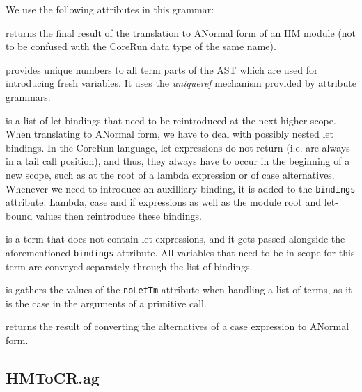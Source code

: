 \documentclass{scrartcl}
\newcommand{\attrdesc}[2]{\texttt{#1}, \emph{#2}}
\begin{document}
We use the following attributes in this grammar:

\begin{description}[style=multiline,leftmargin=4cm,font=\normalfont]

\item[\attrdesc{anf :: Mod}{synthesized}] returns the final result of the translation to ANormal form of an HM module (not to be confused with the CoreRun data type of the same name).

\item[\attrdesc{counter :: Int}{chained}] provides unique numbers to all term parts of the AST which are used for introducing fresh variables. It uses the \emph{uniqueref} mechanism provided by attribute grammars.

\item[\attrdesc{bindings :: Bindings}{synthesized}] is a list of let bindings that need to be reintroduced at the next higher scope. When translating to ANormal form, we have to deal with possibly nested let bindings. In the CoreRun language, let expressions do not return (i.e. are always in a tail call position), and thus, they always have to occur in the beginning of a new scope, such as at the root of a lambda expression or of case alternatives.
Whenever we need to introduce an auxilliary binding, it is added to the \texttt{bindings} attribute.
Lambda, case and if expressions as well as the module root and let-bound values then reintroduce these bindings.

\item[\attrdesc{noLetTm :: Tm}{synthesized}] is a term that does not contain let expressions, and it gets passed alongside the aforementioned \texttt{bindings} attribute.
All variables that need to be in scope for this term are conveyed separately through the list of bindings.

\item[\attrdesc{noLetTmL :: TmL}{synthesized}] is gathers the values of the \texttt{noLetTm} attribute when handling a list of terms, as it is the case in the arguments of a primitive call.

\item[\attrdesc{anfAltL :: AltL}{synthesized}] returns the result of converting the alternatives of a case expression to ANormal form.

\end{description}

\subsection{HMToCR.ag}
\end{document}
